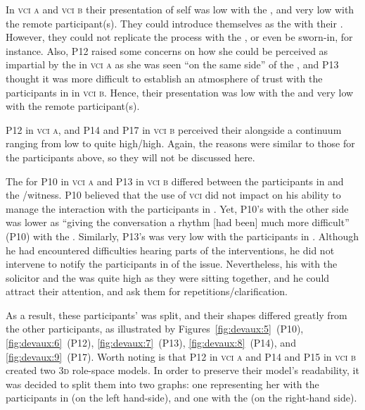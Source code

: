 \documentclass[output=paper]{langsci/langscibook}
\begin{document}
In \textsc{vci a} and \textsc{vci b} their presentation of self was low with the , and very low with the remote participant(s). They could introduce themselves as the  with their . However, they could not replicate the process with the , or even be sworn-in, for instance. Also, P12 raised some concerns on how she could be perceived as impartial by the  in \textsc{vci a} as she was seen “on the same side” of the , and P13 thought it was more difficult to establish an atmosphere of trust with the participants in  in \textsc{vci b}. Hence, their presentation was low with the  and very low with the remote participant(s).

P12 in \textsc{vci a}, and P14 and P17 in \textsc{vci b} perceived their  alongside a continuum ranging from low to quite high/high. Again, the reasons were similar to those for the participants above, so they will not be discussed here. 

The  for P10 in \textsc{vci a} and P13 in \textsc{vci b} differed between the participants in  and the /witness. P10 believed that the use of \textsc{vci}  did not impact on his ability to manage the interaction with the participants in . Yet, P10’s  with the other side was lower as “giving the conversation a rhythm [had been] much more difficult” (P10) with the . Similarly, P13’s  was very low with the participants in . Although he had encountered difficulties hearing parts of the  interventions, he did not intervene to notify the participants in  of the issue. Nevertheless, his  with the solicitor and the  was quite high as they were sitting together, and he could attract their attention, and ask them for repetitions/clarification.

As a result, these participants’  was split, and their shapes differed greatly from the other participants, as illustrated by Figures~\ref{fig:devaux:5}~(P10), \ref{fig:devaux:6}~(P12), \ref{fig:devaux:7}~(P13), \ref{fig:devaux:8}~(P14), and \ref{fig:devaux:9}~(P17). Worth noting is that P12 in \textsc{vci a} and P14 and P15 in \textsc{vci b} created two \textsc{3d} role-space models. In order to preserve their model’s readability, it was decided to split them into two graphs: one representing her  with the participants in  (on the left hand-side), and one with the  (on the right-hand side).
\end{document}

